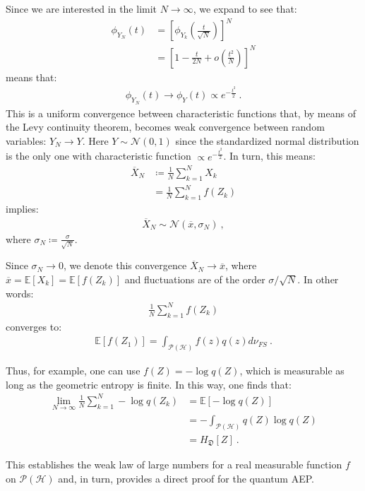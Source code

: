 \documentclass[draft,nofootinbib,pre,twocolumn,showkeys,superscriptaddress,preprintnumbers,floatfix]{revtex4-1}
\newcommand{\1}{\mathbbm{1}}
\newcommand{\PH}{\mathcal{P}(\mathcal{H})}
\begin{document}
Since we are interested in the limit $N \to \infty$, we expand to see that:
\begin{align*}
\phi_{Y_N}(t) & = \left[\phi_{Y_k}(\frac{t}{\sqrt{N}}) \right]^N \\
  & = \left[1 - \frac{t}{2N} + o\left(\frac{t^2}{N}\right) \right]^N
\end{align*}
means that:
\begin{align*}
\phi_{Y_N}(t) \to \phi_Y(t) \propto e^{-\frac{t^2}{2}}
  ~.
\end{align*}
This is a uniform convergence between characteristic functions that, by means
of the Levy continuity theorem, becomes weak convergence between random variables:
$Y_N \to Y$. Here $Y \sim \mathcal{N}(0,1)$ since the standardized normal
distribution is the only one with characteristic function $\propto
e^{-\frac{t^2}{2}}$. In turn, this means:
\begin{align*}
\overline{X}_N & \coloneqq \frac{1}{N} \sum_{k=1}^N X_k \\
  & = \frac{1}{N} \sum_{k=1}^N f(Z_k)
\end{align*}
implies:
\begin{align*}
\overline{X}_N \sim \mathcal{N}(\overline{x},\sigma_N)
  ~,
\end{align*}
where $\sigma_N \coloneqq \frac{\sigma}{\sqrt{N}}$.

Since $\sigma_N \to 0$, we denote this convergence $\overline{X}_N \to
\overline{x}$, where $\overline{x} = \mathbb{E}[X_k] = \mathbb{E}[f(Z_k)]$ and
fluctuations are of the order $\sigma/ \sqrt{N}$. In other words:
\begin{align*}
\frac{1}{N} \sum_{k=1}^N f(Z_k)
\end{align*}
converges to:
\begin{align*}
\mathbb{E}[f(Z_1)] = \int_{\PH} f(z)q(z)d\nu_{FS}
  ~.
\end{align*}

Thus, for example, one can use $f(Z) = - \log q(Z)$, which is measurable as
long as the geometric entropy is finite. In this way, one finds that:
\begin{align*}
\lim_{N \to \infty} \frac{1}{N}\sum_{k=1}^N -\log q(Z_k)
  & = \mathbb{E}[-\log q(Z)] \\
  & = - \int_{\PH} q(Z) \log q(Z) \\
  & = H_{\mathfrak{D}}[Z]
  ~.
\end{align*}

This establishes the weak law of large numbers for a real measurable function
$f$ on $\PH$ and, in turn, provides a direct proof for the quantum AEP.
\end{document}

